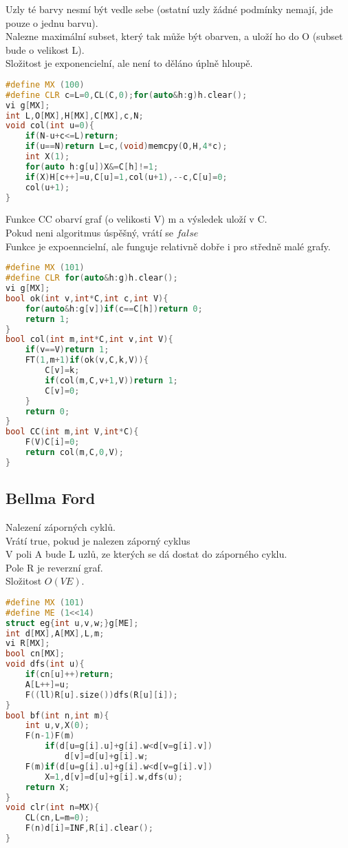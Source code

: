 \documentclass[11pt]{article}
\begin{document}
Uzly té barvy nesmí být vedle sebe (ostatní uzly žádné podmínky nemají, jde pouze o jednu barvu).
\\Nalezne maximální subset, který tak může být obarven, a uloží ho do \textsf{O} (subset bude o velikost \textsf{L}).
\\Složitost je exponencielní, ale není to děláno úplně hloupě.
\begin{lstlisting}[language=C++]
#define MX (100)
#define CLR c=L=0,CL(C,0);for(auto&h:g)h.clear();
vi g[MX];
int L,O[MX],H[MX],C[MX],c,N;
void col(int u=0){
    if(N-u+c<=L)return;
    if(u==N)return L=c,(void)memcpy(O,H,4*c);
    int X(1);
    for(auto h:g[u])X&=C[h]!=1;
    if(X)H[c++]=u,C[u]=1,col(u+1),--c,C[u]=0;
    col(u+1);
}
\end{lstlisting}
Funkce \textsf{CC} obarví graf (o velikosti \textsf{V}) \textsf{m} a výsledek uloží v \textsf{C}.
\\Pokud neni algoritmus úspěšný, vrátí se $false$
\\Funkce je expoenncielní, ale funguje relativně dobře i pro středně malé grafy.
\begin{lstlisting}[language=C++]
#define MX (101)
#define CLR for(auto&h:g)h.clear();
vi g[MX];
bool ok(int v,int*C,int c,int V){
    for(auto&h:g[v])if(c==C[h])return 0;
    return 1;
}
bool col(int m,int*C,int v,int V){
    if(v==V)return 1;
    FT(1,m+1)if(ok(v,C,k,V)){
        C[v]=k;
        if(col(m,C,v+1,V))return 1;
        C[v]=0;
    }
    return 0;
}
bool CC(int m,int V,int*C){
    F(V)C[i]=0;
    return col(m,C,0,V);
}
\end{lstlisting}
\subsection{Bellma Ford}
Nalezení záporných cyklů.
\\Vrátí true, pokud je nalezen záporný cyklus
\\V poli \textsf{A} bude \textsc{L} uzlů, ze kterých se dá dostat do záporného cyklu.
\\Pole \textsf{R} je reverzní graf.
\\Složitost $O(VE)$.
\begin{lstlisting}[language=C++]
#define MX (101)
#define ME (1<<14)
struct eg{int u,v,w;}g[ME];
int d[MX],A[MX],L,m;
vi R[MX];
bool cn[MX];
void dfs(int u){
    if(cn[u]++)return;
    A[L++]=u;
    F((ll)R[u].size())dfs(R[u][i]);
}
bool bf(int n,int m){
    int u,v,X(0);
    F(n-1)F(m)
        if(d[u=g[i].u]+g[i].w<d[v=g[i].v])
            d[v]=d[u]+g[i].w;
    F(m)if(d[u=g[i].u]+g[i].w<d[v=g[i].v])
        X=1,d[v]=d[u]+g[i].w,dfs(u);
    return X;
}
void clr(int n=MX){
    CL(cn,L=m=0);
    F(n)d[i]=INF,R[i].clear();
}
\end{lstlisting}
\end{document}
